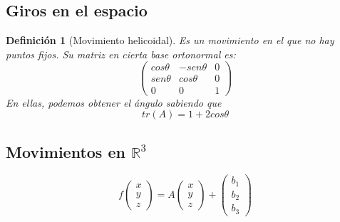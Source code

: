 \documentclass[11pt, a4paper]{article}
\newif\IfInSansMode
\newcommand{\R}{\mathbb{R}}
\theoremstyle{theorem-style}
\theoremstyle{definition-style}
\newtheorem{ndef}{Definición}[section]
\theoremstyle{remark-style}
\theoremstyle{example-style}
\begin{document}
\subsection{Giros en el espacio}
\begin{ndef}[Movimiento helicoidal]
  Es un movimiento en el que no hay puntos fijos. Su matriz en cierta base ortonormal es:
  \[
    \begin{pmatrix}
      cos \theta & -sen\theta & 0 \\
      sen \theta & cos\theta & 0\\
      0 & 0 & 1
    \end{pmatrix} 
  \]
  En ellas, podemos obtener el ángulo sabiendo que 
  \[
    tr(A) = 1+2cos\theta
  \]
\end{ndef}



\subsection{Movimientos en $\R^3$}

\[
  f \begin{pmatrix}
    x\\
    y\\
    z
  \end{pmatrix} = A\begin{pmatrix}
    x\\
    y\\
    z
  \end{pmatrix} + \begin{pmatrix}
    b_1\\
    b_2\\
    b_3
  \end{pmatrix}
\]
\end{document}
